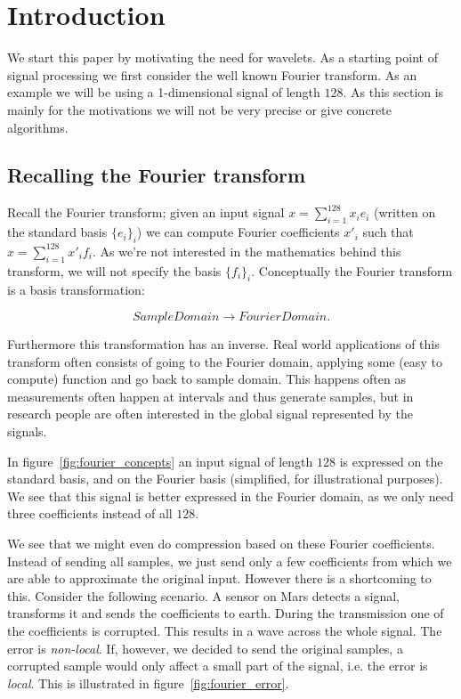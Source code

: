 
\section{Introduction}
\label{sec:intro}
We start this paper by motivating the need for wavelets. As a starting point of signal processing we first consider the well known Fourier transform. As an example we will be using a 1-dimensional signal of length $128$. As this section is mainly for the motivations we will not be very precise or give concrete algorithms.

\subsection{Recalling the Fourier transform}
Recall the Fourier transform; given an input signal $x = \sum_{i=1}^{128} x_i e_i$ (written on the standard basis $\{e_i\}_i$) we can compute Fourier coefficients $x'_i$ such that $x = \sum_{i=1}^{128} x'_i f_i$. As we're not interested in the mathematics behind this transform, we will not specify the basis $\{f_i\}_i$. Conceptually the Fourier transform is a basis transformation:

$$ SampleDomain \to FourierDomain. $$

Furthermore this transformation has an inverse. Real world applications of this transform often consists of going to the Fourier domain, applying some (easy to compute) function and go back to sample domain. This happens often as measurements often happen at intervals and thus generate samples, but in research people are often interested in the global signal represented by the signals.

In figure~\ref{fig:fourier_concepts} an input signal of length $128$ is expressed on the standard basis, and on the Fourier basis (simplified, for illustrational purposes). We see that this signal is better expressed in the Fourier domain, as we only need three coefficients instead of all $128$.


We see that we might even do compression based on these Fourier coefficients. Instead of sending all samples, we just send only a few coefficients from which we are able to approximate the original input. However there is a shortcoming to this. Consider the following scenario. A sensor on Mars detects a signal, transforms it and sends the coefficients to earth. During the transmission one of the coefficients is corrupted. This results in a wave across the whole signal. The error is \emph{non-local}. If, however, we decided to send the original samples, a corrupted sample would only affect a small part of the signal, i.e. the error is \emph{local}. This is illustrated in figure~\ref{fig:fourier_error}.

